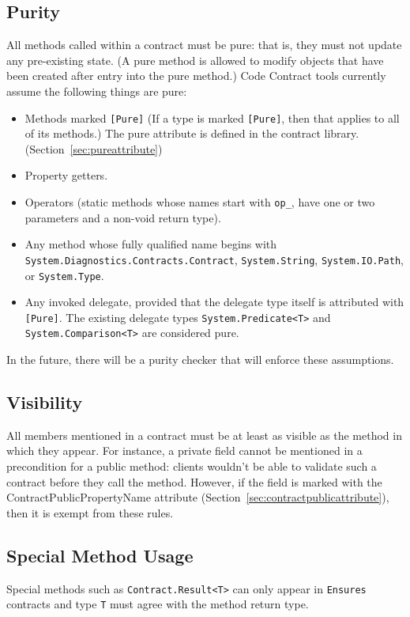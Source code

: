 \documentclass{article}
\newcommand{\code}[1]{\lstinline{#1}}
\begin{document}
\subsection{Purity}
\label{sec:purity}
All methods called within a contract must be pure: that is, they must
not update any pre-existing state. (A pure method is allowed to modify
objects that have been created after entry into the pure method.)
Code Contract tools currently assume the following things are pure:
\begin{itemize}
\item	Methods marked \code{[Pure]} (If a type is marked \code{[Pure]}, then that applies to all of its methods.) The pure attribute is defined in the contract library. (Section~\ref{sec:pureattribute})
\item	Property getters.
\item	Operators (static methods whose names start with \code{op_}, have one or two parameters and a non-void return type).
\item	Any method whose fully qualified name begins with
  \code{System.Diagnostics.Contracts.Contract},
  \code{System.String}, \code{System.IO.Path}, or \code{System.Type}.
\item Any invoked delegate, provided that the delegate type itself is
  attributed with \code{[Pure]}. The existing delegate types
  \code{System.Predicate<T>} and \code{System.Comparison<T>} are
  considered pure.
\end{itemize}
In the future, there will be a purity checker that will enforce these assumptions.

\subsection{Visibility}
\label{sec:visibility}
All members mentioned in a contract must be at least as visible as the
method in which they appear. For instance, a private field cannot be
mentioned in a precondition for a public method: clients wouldn't be
able to validate such a contract before they call the method. However,
if the field is marked with the ContractPublicPropertyName attribute
(Section~\ref{sec:contractpublicattribute}), then it is exempt from these rules.

\subsection{Special Method Usage}
Special methods such as \code{Contract.Result<T>} can only appear
in \code{Ensures} contracts and type \code{T} must agree with the
method return type.
\end{document}
